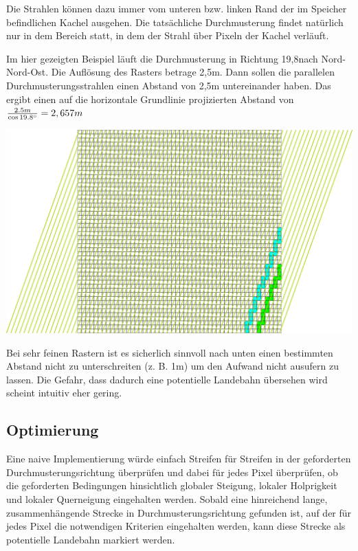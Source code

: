 \documentclass[
11pt, %
a4paper, %
oneside, %
pdfspacing, %
headinclude,
BCOR5mm, %
ngerman, %
bibtotocnumbered,
]{scrartcl}
\begin{document}
	Die Strahlen können dazu immer vom unteren bzw. linken Rand der im Speicher befindlichen Kachel ausgehen. Die tatsächliche Durchmusterung findet natürlich nur in dem Bereich statt, in dem der Strahl über Pixeln der Kachel verläuft.
	
	Im hier gezeigten Beispiel läuft die Durchmusterung in Richtung 19,8\degree nach Nord-Nord-Ost. Die Auflösung des Rasters betrage 2,5m. Dann sollen die parallelen Durchmusterungsstrahlen einen Abstand von 2,5m untereinander haben. Das ergibt einen auf die horizontale Grundlinie projizierten Abstand von $\frac{2.5m}{\cos 19.8\degree} = 2,657m$
	
	\includegraphics[width=\textwidth]{./drawings/Durchmusterungspfade_schraeg.png}
	
	Bei sehr feinen Rastern ist es sicherlich sinnvoll nach unten einen bestimmten Abstand nicht zu unterschreiten (z. B. 1m) um den Aufwand nicht ausufern zu lassen. Die Gefahr, dass dadurch eine potentielle Landebahn übersehen wird scheint intuitiv eher gering.

	

\subsection{Optimierung}

Eine naive Implementierung würde einfach Streifen für Streifen  in der geforderten Durchmusterungsrichtung überprüfen und dabei für jedes Pixel überprüfen, ob die geforderten Bedingungen hinsichtlich globaler Steigung, lokaler Holprigkeit und lokaler Querneigung eingehalten werden. Sobald eine hinreichend lange, zusammenhängende Strecke in Durchmusterungsrichtung gefunden ist, auf der für jedes Pixel die notwendigen Kriterien eingehalten werden, kann diese Strecke als potentielle Landebahn markiert werden.
\end{document}
